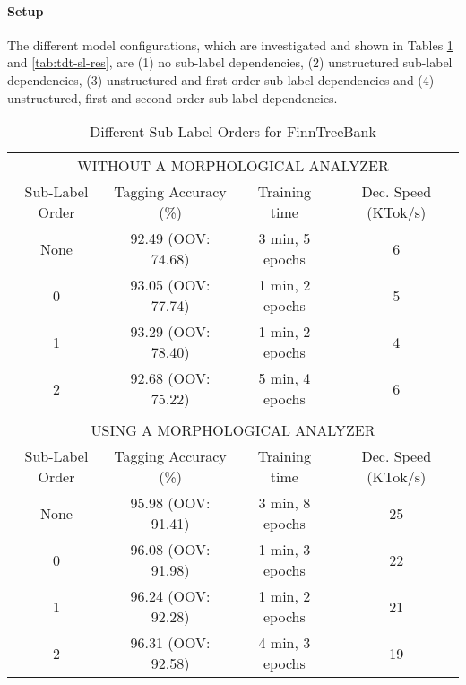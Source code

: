 \paragraph{Setup} The different model configurations, which are
investigated and shown in Tables \ref{tab:ftb-sl-res} and
\ref{tab:tdt-sl-res}, are (1) no sub-label dependencies, (2)
unstructured sub-label dependencies, (3) unstructured and first order
sub-label dependencies and (4) unstructured, first and second order
sub-label dependencies.

\begin{table}[htb!]
\begin{center}
\begin{tabular}{c|c|c|c}
\multicolumn{4}{c}{{\small\uppercase{Without a Morphological Analyzer}}}\\
\noalign{\smallskip}
\hline
Sub-Label Order & Tagging Accuracy (\%) & Training time    & Dec. Speed (KTok/s)\\
\hline
None            & 92.49 (OOV: 74.68)    & 3 min, 5 epochs  & 6                       \\
0               & 93.05 (OOV: 77.74)    & 1 min, 2 epochs  & 5                       \\
1               & 93.29 (OOV: 78.40)    & 1 min, 2 epochs  & 4                       \\
2               & 92.68 (OOV: 75.22)    & 5 min, 4 epochs  & 6                       \\
\multicolumn{4}{c}{ }\\%
\multicolumn{4}{c}{{\small\uppercase{Using a Morphological Analyzer}}}\\
\noalign{\smallskip}
\hline
Sub-Label Order & Tagging Accuracy (\%) & Training time    & Dec. Speed (KTok/s)\\
\hline
None     & 95.98 (OOV: 91.41)           & 3 min, 8 epochs  & 25                       \\
0        & 96.08 (OOV: 91.98)           & 1 min, 3 epochs  & 22                       \\
1        & 96.24 (OOV: 92.28)           & 1 min, 2 epochs  & 21                       \\
2        & 96.31 (OOV: 92.58)           & 4 min, 3 epochs  & 19                       \\
\end{tabular}
\caption{Different Sub-Label Orders for FinnTreeBank}\label{tab:ftb-sl-res}
\end{center}
\end{table}


